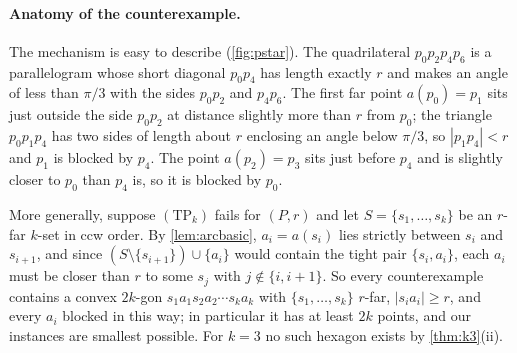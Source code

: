 \paragraph{Anatomy of the counterexample.}
The mechanism is easy to describe (\cref{fig:pstar}). The quadrilateral
$p_0p_2p_4p_6$ is a parallelogram whose short diagonal $p_0p_4$ has length
exactly $r$ and makes an angle of less than $\pi/3$ with the sides $p_0p_2$
and $p_4p_6$. The first far point $a(p_0)=p_1$ sits just outside the side
$p_0p_2$ at distance slightly more than $r$ from $p_0$; the triangle
$p_0p_1p_4$ has two sides of length about $r$ enclosing an angle below
$\pi/3$, so $|p_1p_4|<r$ and $p_1$ is blocked by $p_4$. The point
$a(p_2)=p_3$ sits just before $p_4$ and is slightly closer to $p_0$ than
$p_4$ is, so it is blocked by $p_0$.

More generally, suppose $(\mathrm{TP}_k)$ fails for $(P,r)$ and let
$S=\{s_1,\dots,s_k\}$ be an $r$-far $k$-set in ccw order. By
\cref{lem:arcbasic}, $a_i=a(s_i)$ lies strictly between $s_i$ and $s_{i+1}$,
and since $(S\setminus\{s_{i+1}\})\cup\{a_i\}$ would contain the tight pair
$\{s_i,a_i\}$, each $a_i$ must be closer than $r$ to some $s_j$ with
$j\notin\{i,i+1\}$. So every counterexample contains a convex $2k$-gon
$s_1a_1s_2a_2\cdots s_ka_k$ with $\{s_1,\dots,s_k\}$ $r$-far, $|s_ia_i|\ge r$,
and every $a_i$ blocked in this way; in particular it has at least $2k$
points, and our instances are smallest possible. For $k=3$ no such hexagon
exists by \cref{thm:k3}(ii).


